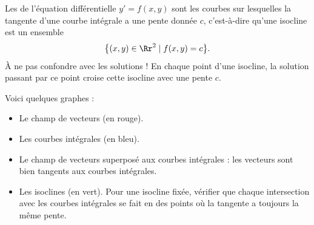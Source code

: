 \documentclass[class=report,crop=false]{standalone}
\begin{document}
Les  de l'équation différentielle $y' = f(x,y)$ sont les courbes sur lesquelles la tangente d'une courbe intégrale a 
une pente donnée $c$, c'est-à-dire qu'une isocline est un ensemble
$$\big\lbrace (x,y) \in \Rr^2 \mid f(x,y) = c \big\rbrace.$$
\`A ne pas confondre avec les solutions ! En chaque point d'une isocline, 
la solution passant par ce point croise cette isocline avec une pente $c$. 


Voici quelques graphes :
\begin{itemize}
  \item Le champ de vecteurs (en rouge). 
  \item Les courbes intégrales (en bleu).
  \item Le champ de vecteurs superposé aux courbes intégrales : 
  les vecteurs sont bien tangents aux courbes intégrales.

  \item Les isoclines (en vert). Pour une isocline fixée, vérifier que chaque intersection 
  avec les courbes intégrales se fait en des points où la tangente a toujours la même pente.
\end{itemize}
\end{document}

